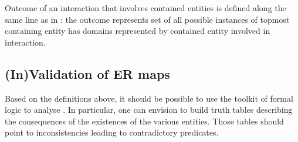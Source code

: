 Outcome of an interaction that involves contained entities is defined along the same line as in : the outcome represents set of all possible instances of topmost containing entity has domains represented by contained entity involved in interaction.

\subsection{(In)Validation of ER maps}

Based on the definitions above, it should be possible to use the toolkit of formal logic to analyse \ERs{}. In particular, one can envision to build truth tables describing the consequences of the existences of the various entities. Those tables should point to inconsistencies leading to contradictory predicates.



